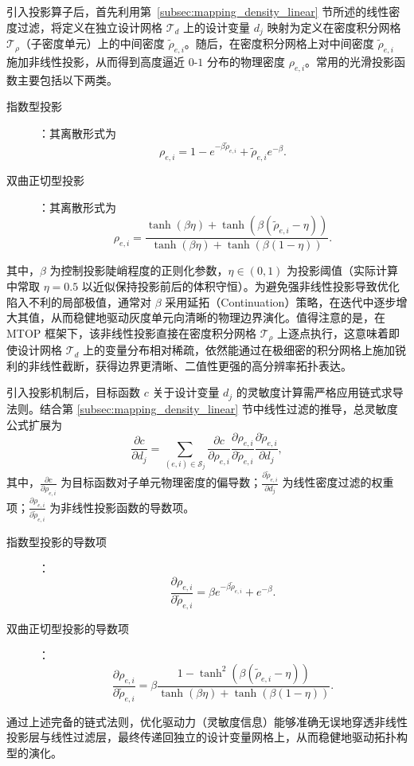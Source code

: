 引入投影算子后，首先利用第~\ref{subsec:mapping_density_linear} 节所述的线性密度过滤，将定义在独立设计网格 $\mathcal{T}_d$ 上的设计变量 $d_{j}$ 映射为定义在密度积分网格 $\mathcal{T}_{\rho}$（子密度单元）上的中间密度 $\tilde{\rho}_{e,i}$。随后，在密度积分网格上对中间密度 $\tilde{\rho}_{e,i}$ 施加非线性投影，从而得到高度逼近 $0$-$1$ 分布的物理密度 $\rho_{e,i}$。常用的光滑投影函数主要包括以下两类。
\begin{description}
	\item[指数型投影]：其离散形式为
	\[
	\rho_{e,i} = 1 - e^{-\beta\tilde{\rho}_{e,i}} + \tilde{\rho}_{e,i}e^{-\beta}.
	\]
	
	\item[双曲正切型投影]：其离散形式为
	\[
	\rho_{e,i} = \frac{\tanh(\beta\eta) + \tanh(\beta(\tilde{\rho}_{e,i} - \eta))}{\tanh(\beta\eta) + \tanh(\beta(1 - \eta))}.
	\]
\end{description}
其中，$\beta$ 为控制投影陡峭程度的正则化参数，$\eta\in(0,1)$ 为投影阈值（实际计算中常取 $\eta=0.5$ 以近似保持投影前后的体积守恒）。为避免强非线性投影导致优化陷入不利的局部极值，通常对 $\beta$ 采用延拓（Continuation）策略，在迭代中逐步增大其值，从而稳健地驱动灰度单元向清晰的物理边界演化。值得注意的是，在 MTOP 框架下，该非线性投影直接在密度积分网格 $\mathcal{T}_{\rho}$ 上逐点执行，这意味着即使设计网格 $\mathcal{T}_d$ 上的变量分布相对稀疏，依然能通过在极细密的积分网格上施加锐利的非线性截断，获得边界更清晰、二值性更强的高分辨率拓扑表达。

引入投影机制后，目标函数 $c$ 关于设计变量 $d_j$ 的灵敏度计算需严格应用链式求导法则。结合第 \ref{subsec:mapping_density_linear} 节中线性过滤的推导，总灵敏度公式扩展为
\[
\frac{\partial c}{\partial d_j} = \sum_{(e,i) \in \mathcal{S}_j} \frac{\partial c}{\partial \rho_{e,i}} \frac{\partial \rho_{e,i}}{\partial \tilde{\rho}_{e,i}} \frac{\partial \tilde{\rho}_{e,i}}{\partial d_j},
\]
其中，$\frac{\partial c}{\partial \rho_{e,i}}$ 为目标函数对子单元物理密度的偏导数；$\frac{\partial \tilde{\rho}_{e,i}}{\partial d_j}$ 为线性密度过滤的权重项；$\frac{\partial \rho_{e,i}}{\partial \tilde{\rho}_{e,i}}$ 为非线性投影函数的导数项。

\begin{description}
	\item[指数型投影的导数项]：
	\[
	\frac{\partial \rho_{e,i}}{\partial \tilde{\rho}_{e,i}} = \beta e^{-\beta\tilde{\rho}_{e,i}} + e^{-\beta}.
	\]
	
	\item[双曲正切型投影的导数项]：
	\[
	\frac{\partial \rho_{e,i}}{\partial \tilde{\rho}_{e,i}} = \beta \frac{1 - \tanh^2(\beta(\tilde{\rho}_{e,i} - \eta))}{\tanh(\beta\eta) + \tanh(\beta(1 - \eta))}.
	\]
\end{description}
通过上述完备的链式法则，优化驱动力（灵敏度信息）能够准确无误地穿透非线性投影层与线性过滤层，最终传递回独立的设计变量网格上，从而稳健地驱动拓扑构型的演化。


